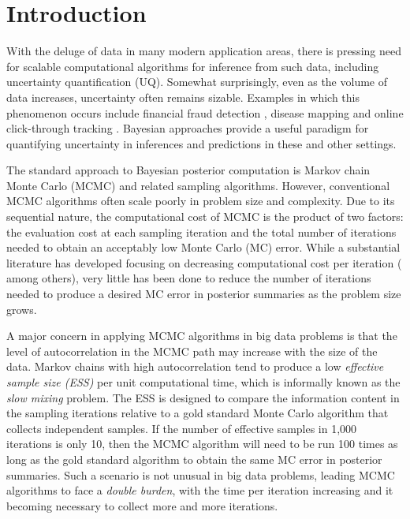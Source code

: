 \documentclass[11pt]{article}
\begin{document}
\newpage



\section{Introduction}

With the deluge of data in many modern application areas, there is pressing need for scalable computational algorithms for inference from such data, including uncertainty quantification (UQ).  Somewhat surprisingly, even as the volume of data increases, uncertainty often remains sizable.  Examples in which this phenomenon occurs include financial fraud detection \citep{ngai2011application}, disease mapping \citep{wakefield2007disease} and online click-through tracking \citep{wang2010click}.  Bayesian approaches provide a useful paradigm for quantifying uncertainty in inferences and predictions in these and other settings.

The standard approach to Bayesian posterior computation is Markov chain Monte Carlo (MCMC) and related sampling algorithms. However,  conventional MCMC algorithms often scale poorly in problem size and complexity. Due to its sequential nature, the computational cost of MCMC is the product of two factors: the evaluation cost at each sampling iteration and the total number of iterations needed to obtain an acceptably low Monte Carlo (MC) error. While a substantial literature has developed focusing on decreasing computational cost per iteration (\cite{minsker2014robust,maclaurin2014firefly,
srivastava2015wasp,conrad2015accelerating} among others), {very little has been done
to reduce the} {number of iterations needed to produce a desired MC error in posterior summaries} 
{as the problem size grows.}

{A major concern in applying MCMC algorithms in big data problems is that the level of autocorrelation in the MCMC path may increase with the size of the data.  Markov chains with high autocorrelation 
tend to produce a low {\em effective sample size (ESS)} per unit computational time, {which is informally known as the  {\em slow mixing} problem}.  The ESS is designed to compare the information content in the sampling iterations relative to a gold standard Monte Carlo algorithm that collects independent samples.  If the number of effective samples in 1,000 iterations is only 10, then the MCMC algorithm will need to be run 100 times as long as the gold standard algorithm to obtain the same MC error in posterior summaries.  Such a scenario is not unusual in big data problems, leading MCMC algorithms to face a {\em double burden}, with the time per iteration increasing and it becoming necessary to collect more and more iterations.} 
\end{document}
